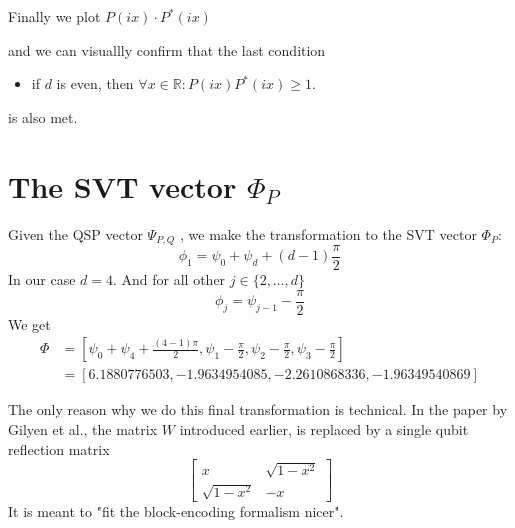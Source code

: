 \documentclass{article}
\begin{document}
\noindent Finally we plot $P(ix)\cdot P^*(ix)$
\begin{center}
\end{center}
and we can visuallly confirm that the last condition
\begin{itemize}
    \item if $d$ is even, then $\forall x \in \mathbb{R}: P(ix)P^*(ix) \geq 1$.
\end{itemize} 
is also met.

%
%


\section*{The SVT vector $\Phi_P$}

\noindent Given the QSP vector $\Psi_{P,Q}$ , we make the transformation to the SVT vector $\Phi_P$:
$$
 \phi_1 = \psi_0 + \psi_d + (d - 1)\frac{\pi}{2} 
 $$
 In our case $d=4$. And for all other $j \in \{2, \dots, d \}$
 $$
 \phi_j = \psi_{j-1} - \frac{\pi}{2}
$$
We get
\begin{align*}
    \Phi & = \left[ \psi_0 + \psi_4 + \frac{(4-1)\pi}{2}, \psi_1 - \frac{\pi}{2}, \psi_2 - \frac{\pi}{2}, \psi_3 - \frac{\pi}{2} \right] \\
           & = [ 6.1880776503, -1.9634954085, - 2.2610868336, -1.96349540869 ]
\end{align*}

\noindent The only reason why we do this final transformation is technical. In the paper by Gilyen et al., the matrix $W$ introduced earlier, is replaced by a single qubit reflection matrix
$$
\begin{bmatrix}
x & \sqrt{1 - x^2} \\
\sqrt{1 - x^2} & -x
\end{bmatrix}
$$
It is meant to "fit the block-encoding formalism nicer".\\
\end{document}
